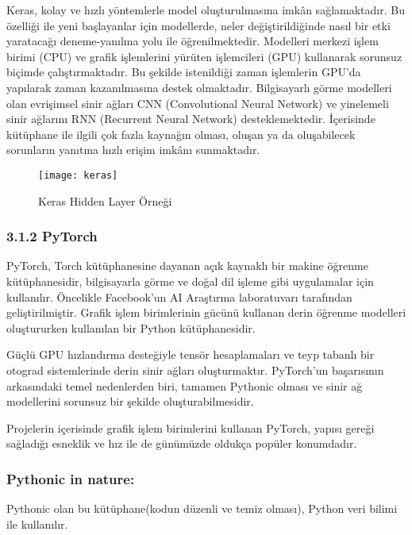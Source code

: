 \documentclass[10pt,a4paper]{report}
\begin{document}
\begin{justify}
	\clearpage
	Keras, kolay ve hızlı yöntemlerle model oluşturulmasına imkân sağlamaktadır. Bu özelliği ile yeni başlayanlar için modellerde, neler değiştirildiğinde nasıl bir etki yaratacağı deneme-yanılma yolu ile öğrenilmektedir.
	Modelleri merkezi işlem birimi (CPU) ve grafik işlemlerini yürüten işlemcileri (GPU) kullanarak sorunsuz biçimde çalıştırmaktadır. Bu şekilde istenildiği zaman işlemlerin GPU’da yapılarak zaman kazanılmasına destek olmaktadır.
	Bilgisayarlı görme modelleri olan evrişimsel sinir ağları CNN (Convolutional Neural Network) ve yinelemeli sinir ağlarını RNN (Recurrent Neural Network) desteklemektedir.
	İçerisinde kütüphane ile ilgili çok fazla kaynağın olması, oluşan ya da oluşabilecek sorunların yanıtına hızlı erişim imkânı sunmaktadır.
	
	\begin{figure}[!h]
		\centering
		\texttt{[image: keras]}
		\caption{ Keras Hidden Layer Örneği  \cite{allibhai}}
		\label{Keras}
	\end{figure}
	
		\subsubsection*{3.1.2 PyTorch}
		
		PyTorch, Torch kütüphanesine dayanan açık kaynaklı bir makine öğrenme kütüphanesidir, bilgisayarla görme ve doğal dil işleme gibi uygulamalar için kullanılır. Öncelikle Facebook'un AI Araştırma laboratuvarı tarafından geliştirilmiştir. Grafik işlem birimlerinin gücünü kullanan derin öğrenme modelleri oluştururken kullanılan bir Python kütüphanesidir.
		
		Güçlü GPU hızlandırma desteğiyle tensör hesaplamaları ve teyp tabanlı bir otograd sistemlerinde derin sinir ağları oluşturmaktır. PyTorch’un başarısının arkasındaki temel nedenlerden biri, tamamen Pythonic olması ve sinir ağ modellerini sorunsuz bir şekilde oluşturabilmesidir.
		
		Projelerin içerisinde grafik işlem birimlerini kullanan PyTorch, yapısı gereği sağladığı esneklik ve hız ile de günümüzde oldukça popüler konumdadır\cite{talentgrid_pytorch}.
		
		\subsubsection{Pythonic in nature:} Pythonic olan bu kütüphane(kodun düzenli ve temiz olması), Python veri bilimi ile kullanılır.
	

\end{justify}
\end{document}
